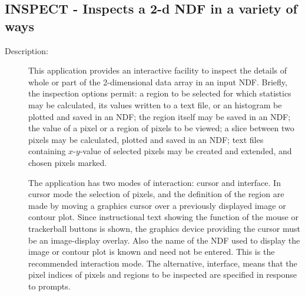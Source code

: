 \documentclass[twoside,11pt]{article}
\newcommand{\stardocinitials}  {SUN}
\newcommand{\stardocnumber}    {239.2}
\newcommand{\stardocname}{\stardocinitials /\stardocnumber}
\newcommand{\xlabel}[1]{}
\newlength{\sstbannerlength}
\newlength{\sstcaptionlength}
\newlength{\sstexampleslength}
\newlength{\sstexampleswidth}
\newcommand{\sstroutine}[3]{
   \goodbreak
   \markboth{{\stardocname}~ --- #1}{{\stardocname}~ --- #1}
   \rule{\textwidth}{0.5mm}
   \vspace{-7ex}
   \newline
   \settowidth{\sstbannerlength}{{\Large {\bf #1}}}
   \setlength{\sstcaptionlength}{\textwidth}
   \setlength{\sstexampleslength}{\textwidth}
   \addtolength{\sstbannerlength}{0.5em}
   \addtolength{\sstcaptionlength}{-2.0\sstbannerlength}
   \addtolength{\sstcaptionlength}{-4.9pt}
   \settowidth{\sstexampleswidth}{{\bf Examples:}}
   \addtolength{\sstexampleslength}{-\sstexampleswidth}
   \parbox[t]{\sstbannerlength}{\flushleft{\Large {\bf #1}}}
   \parbox[t]{\sstcaptionlength}{\center{\Large #2}}
   \parbox[t]{\sstbannerlength}{\flushright{\Large {\bf #1}}}
   \begin{description}
      #3
   \end{description}
}
\newcommand{\sstdescription}[1]{\item[Description:] #1}
\renewcommand{\sstroutine}[3]{
      \subsection{#1\xlabel{#1}-\label{#1}#2}
      \begin{description}
         #3
      \end{description}
   }
\renewcommand{\sstdescription}[1]{\item[Description:]
      \begin{description}
         #1
      \end{description}
   }
\begin{document}
\sstroutine{
   INSPECT
}{
   Inspects a 2-d NDF in a variety of ways
}{
   \sstdescription{
      This application provides an interactive facility to inspect the
      details of whole or part of the 2-dimensional data array in an input NDF.
      Briefly, the inspection options permit: a region to be selected
      for which statistics may be calculated, its values written to a
      text file, or an histogram be plotted and saved in an NDF; the
      region itself may be saved in an NDF; the value of a pixel or a
      region of pixels to be viewed; a slice between two pixels may be
      calculated, plotted and saved in an NDF; text files containing
      $x$-$y$-value of selected pixels may be created and extended, and
      chosen pixels marked.

      The application has two modes of interaction: cursor and
      interface.  In cursor mode the selection of pixels, and the
      definition of the region are made by moving a graphics cursor
      over a previously displayed image or contour plot.  Since
      instructional text showing the function of the mouse or
      trackerball buttons is shown, the graphics device providing the
      cursor must be an image-display overlay.  Also the name of the
      NDF used to display the image or contour plot is known and need
      not be entered.  This is the recommended interaction mode.  The
      alternative, interface, means that the pixel indices of pixels
      and regions to be inspected are specified in response to prompts.

}}
\end{document}
